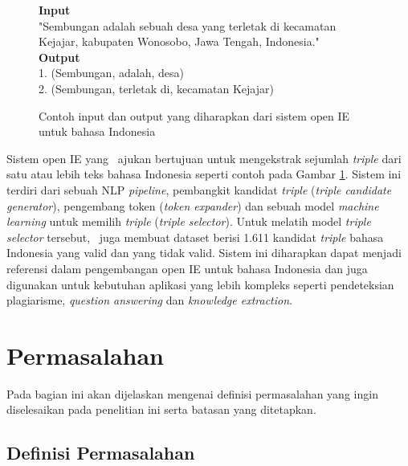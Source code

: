 \begin{figure}
	\begin{mdframed}
		\textbf{Input} \\
		"Sembungan adalah sebuah desa yang terletak di kecamatan Kejajar, kabupaten Wonosobo, Jawa Tengah, Indonesia." \\
		
		\textbf{Output} \\
		1. (Sembungan, adalah, desa) \\
		2. (Sembungan, terletak di, kecamatan Kejajar)
	\end{mdframed}
	\caption{Contoh input dan output yang diharapkan dari sistem open IE untuk bahasa Indonesia}
	\label{fig:example_io_openie}
\end{figure}

Sistem open IE yang \saya~ajukan bertujuan untuk mengekstrak sejumlah \textit{triple} dari satu atau lebih teks bahasa Indonesia seperti contoh pada Gambar \ref{fig:example_io_openie}. Sistem ini terdiri dari sebuah NLP \textit{pipeline}, pembangkit kandidat \textit{triple} (\textit{triple candidate generator}), pengembang token (\textit{token expander}) dan sebuah model \textit{machine learning} untuk memilih \textit{triple} (\textit{triple selector}). Untuk melatih model \textit{triple selector} tersebut, \saya~juga membuat dataset berisi 1.611 kandidat \textit{triple} bahasa Indonesia yang valid dan yang tidak valid. Sistem ini diharapkan dapat menjadi referensi dalam pengembangan open IE untuk bahasa Indonesia dan juga digunakan untuk kebutuhan aplikasi yang lebih kompleks seperti pendeteksian plagiarisme, \textit{question answering} dan \textit{knowledge extraction}.

\section{Permasalahan}
Pada bagian ini akan dijelaskan mengenai definisi permasalahan yang ingin diselesaikan pada penelitian ini serta batasan yang ditetapkan.


\subsection{Definisi Permasalahan}

